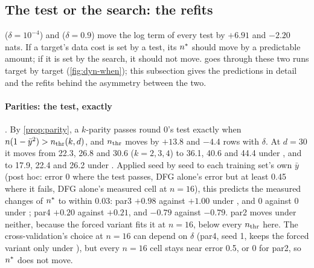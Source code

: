 \begin{table}[t]
\centering{\footnotesize\setlength{\tabcolsep}{3pt}\renewcommand{\arraystretch}{1.05}
}
\caption{The ablations by target family (the groups of \cref{sec:interp-atlas}; group sizes in the header) on the 65 targets of the five ablation suites . Eight of the nine groups appear: no target of the multiplexer group (mux6, mux11) is in these suites, and 's mux is grouped with the compositions. Each cell: mean $\log_2$ ratio over the targets both learn, and the targets clearly lower / clearly higher. The symmetric group holds the three targets that neither DFG alone nor any ablation learns (fd\_10, h6\_00, f7\_05), so its means are over 9 targets (6 under ). Bottom: the paired and unpaired nulls, and the core DFG on the same 65 targets (post hoc). Source: .}
\label{tab:abl-family}
\end{table}

\subsection{The test or the search: the refits}\label{sec:abl-test}

 ($\delta=10^{-4}$) and  ($\delta=0.9$) move the log term of every test by $+6.91$ and $-2.20$ nats. If a target's data cost is set by a test, its $n^{*}$ should move by a predictable amount; if it is set by the search, it should not move.  goes through these two runs target by target (\cref{fig:dyn-when}); this subsection gives the predictions in detail and the refits behind the asymmetry between the two.

\paragraph{Parities: the test, exactly} . By \cref{prop:parity}, a $k$-parity passes round 0's test exactly when $n(1-\bar y^2)>n_{\rm thr}(k,d)$, and $n_{\rm thr}$ moves by $+13.8$ and $-4.4$ rows with $\delta$. At $d=30$ it moves from 22.3, 26.8 and 30.6 ($k=2,3,4$) to 36.1, 40.6 and 44.4 under , and to 17.9, 22.4 and 26.2 under . Applied seed by seed to each training set's own $\bar y$ (post hoc: error 0 where the test passes, DFG alone's error but at least 0.45 where it fails, DFG alone's measured cell at $n=16$), this predicts the measured changes of $n^{*}$ to within 0.03: par3 $+0.98$ against $+1.00$ under , and 0 against 0 under ; par4 $+0.20$ against $+0.21$, and $-0.79$ against $-0.79$. par2 moves under neither, because the forced variant fits it at $n=16$, below every $n_{\rm thr}$ here. The cross-validation's choice at $n=16$ can depend on $\delta$ (par4, seed 1, keeps the forced variant only under ), but every $n=16$ cell stays near error 0.5, or 0 for par2, so $n^{*}$ does not move.

